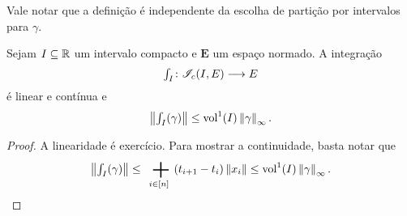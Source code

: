 Vale notar que a definição é independente da escolha de partição por intervalos para $\gamma$.

\begin{proposition}
Sejam $I \subseteq \mathbb{R}$ um intervalo compacto e $\bm E$ um espaço normado. A integração
	\begin{equation*}
	\textstyle\int_I\colon \allowbreak \mathscr{I}_{c}(I,E) \longrightarrow E
	\end{equation*}
é linear e contínua e
	\begin{equation*}
	\left\Vert{\textstyle\int_I(\gamma)}\right\Vert \leq \operatorname{vol}^1(I) \left\Vert{\gamma}\right\Vert_{\infty}.
	\end{equation*}
\end{proposition}
\begin{proof}
A linearidade é exercício.
%
%
%
Para mostrar a continuidade, basta notar que
	\begin{equation*}
	\nor{\textstyle\int_I(\gamma)} \leq \sum_{i \in [n]} (t_{i+1}-t_i) \nor{x_i} \leq \vol^1(I)\norsup{\gamma}.
	\qedhere
	\end{equation*}
\end{proof}

